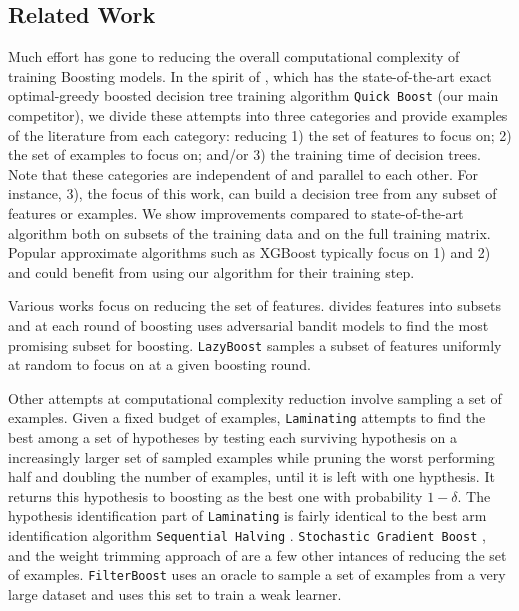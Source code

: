 \subsection{Related Work}\label{related-work}


Much effort has gone to reducing the overall computational complexity of
training Boosting models.
In the spirit of \citet{icml2013_appel13}, which has the state-of-the-art
exact optimal-greedy boosted decision tree training algorithm \texttt{Quick Boost}
(our main competitor), we divide these attempts into three categories and
provide examples of the literature from each category: reducing
1) the set of features to focus on;
2) the set of examples to focus on; and/or
3) the training time of decision trees.
Note that these categories are independent of and parallel to each other.
For instance, 3), the focus of this work, can build a decision tree from
any subset of features or examples.
We show improvements compared to state-of-the-art algorithm both on subsets
of the training data and on the full training matrix.
Popular approximate algorithms such as
XGBoost \citep{Chen:2016:XST:2939672.2939785}
typically focus on 1) and 2)
and could benefit from using our algorithm for their training step.

Various works \citep{4270071, PaulBiswajitAthithanEtAl} focus on reducing the set of features.
\citet{busafekete:in2p3-00614564} divides features into subsets
and at each round of boosting uses adversarial bandit models to find the most promising subset for boosting. \texttt{LazyBoost} \citep{Escudero:2001:ULW:2387364.2387381} samples a subset of features uniformly at random to focus on at a given boosting round. 

Other attempts at computational complexity reduction involve sampling a set of
examples.
Given a fixed budget of examples, \texttt{Laminating}
\citep{Dubout:2014:ASL:2627435.2638580} attempts to find the best among a set of
hypotheses by testing each surviving hypothesis on a increasingly larger set of
sampled examples while pruning the worst performing half and doubling the number of examples, until it is left
with one hypthesis. It returns this hypothesis to boosting as the best one with probability $1-\delta$. The hypothesis identification part of \texttt{Laminating} is fairly identical to the best arm identification algorithm \texttt{Sequential Halving} \citep{icml2013_karnin13}. \texttt{Stochastic Gradient Boost} \citep{FriedmanStochasticGB}, and the weight trimming approach of \citet{Friedman98additivelogistic} are a few other intances of reducing the set of examples. \texttt{FilterBoost} \citep{NIPS2007_3321} uses an oracle to sample a set of examples from a very large dataset and uses this set to train a weak learner.

